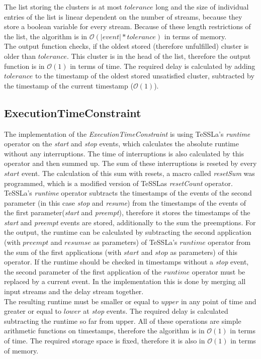 	The list storing the clusters is at most $tolerance$ long and the size of individual entries of the list is linear dependent on the number of streams, because they store a boolean variable for every stream. Because of these length restrictions of the list, the algorithm is in $\mathcal{O}(|event|*tolerance)$ in terms of memory.\\
	The output function checks, if the oldest stored (therefore unfulfilled) cluster is older than $tolerance$. This cluster is in the head of the list, therefore the output function is in $\mathcal{O}(1)$ in terms of time. The required delay is calculated by adding $tolerance$ to the timestamp of the oldest stored unsatisfied cluster, subtracted by the timestamp of the current timestamp ($\mathcal{O}(1)$).
	
\subsection{ExecutionTimeConstraint}
	The implementation of the \emph{ExecutionTimeConstraint} is using TeSSLa's \emph{runtime} operator on the \emph{start} and \emph{stop} events, which calculates the absolute runtime without any interruptions. The time of interruptions is also calculated by this operator and then summed up. The sum of these interruptions is reseted by every $start$ event. The calculation of this sum with resets, a macro called \textit{resetSum} was programmed, which is a modified version of TeSSLas \textit{resetCount} operator.\\
	TeSSLa's \emph{runtime} operator subtracts the timestamps of the events of the second parameter (in this case \emph{stop} and \emph{resume}) from the timestamps of the events of the first parameter(\emph{start} and \emph{preempt}), therefore it stores the timestamps of the \emph{start} and \emph{preempt} events are stored, additionally to the sum the preemptions.
	For the output, the runtime can be calculated by subtracting the second application (with $preempt$ and $resumse$ as parameters) of TeSSLa's $runtime$ operator from the sum of the first applications (with $start$ and $stop$ as parameters) of this operator. If the runtime should be checked in timestamps without a \emph{stop} event, the second parameter of the first application of the $runtime$ operator must be replaced by a current event. In the implementation this is done by merging all input streams and the delay stream together.\\
	The resulting runtime must be smaller or equal to $upper$ in any point of time and greater or equal to $lower$ at \emph{stop} events. The required delay is calculated subtracting the runtime so far from upper. All of these operations are simple arithmetic functions on timestamps, therefore the algorithm is in $\mathcal{O}(1)$ in terms of time. The required storage space is fixed, therefore it is also in $\mathcal{O}(1)$ in terms of memory.

